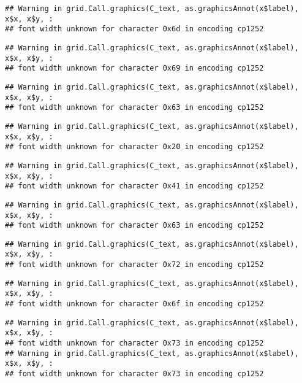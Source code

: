 \documentclass[
]{article}
\begin{document}
\begin{verbatim}
## Warning in grid.Call.graphics(C_text, as.graphicsAnnot(x$label), x$x, x$y, :
## font width unknown for character 0x6d in encoding cp1252
\end{verbatim}

\begin{verbatim}
## Warning in grid.Call.graphics(C_text, as.graphicsAnnot(x$label), x$x, x$y, :
## font width unknown for character 0x69 in encoding cp1252
\end{verbatim}

\begin{verbatim}
## Warning in grid.Call.graphics(C_text, as.graphicsAnnot(x$label), x$x, x$y, :
## font width unknown for character 0x63 in encoding cp1252
\end{verbatim}

\begin{verbatim}
## Warning in grid.Call.graphics(C_text, as.graphicsAnnot(x$label), x$x, x$y, :
## font width unknown for character 0x20 in encoding cp1252
\end{verbatim}

\begin{verbatim}
## Warning in grid.Call.graphics(C_text, as.graphicsAnnot(x$label), x$x, x$y, :
## font width unknown for character 0x41 in encoding cp1252
\end{verbatim}

\begin{verbatim}
## Warning in grid.Call.graphics(C_text, as.graphicsAnnot(x$label), x$x, x$y, :
## font width unknown for character 0x63 in encoding cp1252
\end{verbatim}

\begin{verbatim}
## Warning in grid.Call.graphics(C_text, as.graphicsAnnot(x$label), x$x, x$y, :
## font width unknown for character 0x72 in encoding cp1252
\end{verbatim}

\begin{verbatim}
## Warning in grid.Call.graphics(C_text, as.graphicsAnnot(x$label), x$x, x$y, :
## font width unknown for character 0x6f in encoding cp1252
\end{verbatim}

\begin{verbatim}
## Warning in grid.Call.graphics(C_text, as.graphicsAnnot(x$label), x$x, x$y, :
## font width unknown for character 0x73 in encoding cp1252
## Warning in grid.Call.graphics(C_text, as.graphicsAnnot(x$label), x$x, x$y, :
## font width unknown for character 0x73 in encoding cp1252
\end{verbatim}
\end{document}
